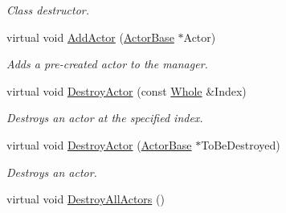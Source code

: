 \begin{DoxyCompactItemize}
\begin{DoxyCompactList}\small\item\em Class destructor. \end{DoxyCompactList}\item 
virtual void \hyperlink{classMezzanine_1_1ActorManager_af801d07590853b3ae0c52574a340ea44}{Add\-Actor} (\hyperlink{classMezzanine_1_1ActorBase}{Actor\-Base} $\ast$Actor)
\begin{DoxyCompactList}\small\item\em Adds a pre-\/created actor to the manager. \end{DoxyCompactList}\item 
virtual void \hyperlink{classMezzanine_1_1ActorManager_a5e4daba372199d0d140fd590a4d0f501}{Destroy\-Actor} (const \hyperlink{namespaceMezzanine_adcbb6ce6d1eb4379d109e51171e2e493}{Whole} \&Index)
\begin{DoxyCompactList}\small\item\em Destroys an actor at the specified index. \end{DoxyCompactList}\item 
virtual void \hyperlink{classMezzanine_1_1ActorManager_a39d628c0ee0eaa225df741835f1061e7}{Destroy\-Actor} (\hyperlink{classMezzanine_1_1ActorBase}{Actor\-Base} $\ast$To\-Be\-Destroyed)
\begin{DoxyCompactList}\small\item\em Destroys an actor. \end{DoxyCompactList}\item 
\hypertarget{classMezzanine_1_1ActorManager_ac71886ad26a513d1b53f0e2d6049539c}{virtual void \hyperlink{classMezzanine_1_1ActorManager_ac71886ad26a513d1b53f0e2d6049539c}{Destroy\-All\-Actors} ()}\label{classMezzanine_1_1ActorManager_ac71886ad26a513d1b53f0e2d6049539c}


\end{DoxyCompactItemize}
